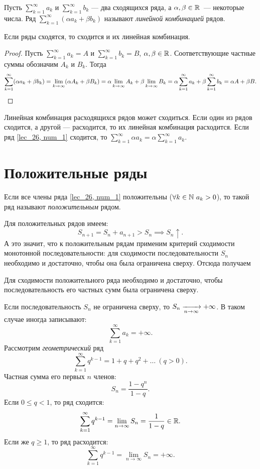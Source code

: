 \documentclass[../../main.tex]{subfiles}
\begin{document}
Пусть $\sum\limits_{k = 1}^\infty a_k$  и $\sum\limits_{k = 1}^\infty b_k$
 --- два сходящихся ряда, а $\alpha, \beta \in \mathbb{R}$~--- некоторые числа.
Ряд $\sum\limits_{k = 1}^\infty(\alpha a_k + \beta b_k)$
 называют \emph{линейной комбинацией} рядов. 
\begin{thm}
Если ряды сходятся, то сходится и их линейная комбинация.
 \end{thm}
\begin{proof}
	Пусть  $\sum\limits_{k = 1}^\infty a_k = A$  
	и $\sum\limits_{k = 1}^\infty b_k = B$, \enspace
	 $\alpha, \beta \in \mathbb{R}$. Соответствующие частные суммы обозначим $A_k$ и 
	 $B_k$. Тогда
 	\[
 		\sum\limits_{k = 1}^\infty(\alpha a_k + \beta b_k) =
 		\lim\limits_{k \to \infty} (\alpha A_k + \beta B_k) =
 		\alpha\lim\limits_{k \to \infty} A_k +
 		\beta\lim\limits_{k \to \infty} B_k =
 		\alpha\sum\limits_{k = 1}^\infty a_k + 
 		\beta\sum\limits_{k = 1}^\infty b_k = \alpha A + 
 		\beta B. \qedhere
 	\]
 \end{proof}
 Линейная комбинация расходящихся рядов может сходиться.
 Если один из рядов сходится, а другой --- расходится, то их линейная комбинация
 расходится. Если ряд \eqref{lec_26, num_1} сходится, 
 то $\sum\limits_{k=1}^\infty \alpha a_k = \alpha \sum\limits_{k=1}^\infty a_k$.
 \section{Положительные ряды}
\begin{definition}
Если все члены ряда \eqref{lec_26, num_1} положительны
($\forall k \in \N \ a_k > 0$),
то такой ряд называют \emph{положительным} рядом.
\end{definition}
Для положительных рядов имеем:
\[
	S_{n+1} = S_n + a_{n+1}  > S_n \implies S_n \uparrow.
\]
А это значит, что к положительным рядам применим 
критерий сходимости монотонной последовательности: для сходимости последовательности $S_n$ необходимо и достаточно, чтобы она была ограничена сверху. Отсюда получаем
 \begin{thm} 
 	\label{lec26:pos_series}
 	 Для сходимости положительного ряда 
 	 необходимо и достаточно, чтобы 
 	 последовательность 
 	 его частных сумм была ограничена сверху.
 \end{thm}
 \begin{rem}
 	 Если  последовательность $S_n$ не ограничена сверху, 
 	 то  $S_n\xrightarrow[n \to \infty]{}{+\infty}$. В таком случае иногда записывают:
 	 \[
 		\sum\limits_{k = 1}^\infty a_k= +\infty
	.\]
	Рассмотрим \emph{геометрический} ряд
	 \[
 		\sum\limits_{k = 1}^\infty q^{k-1}=  1 + q + q^2 + \ldots
 		\ (q > 0).
	\]
	Частная сумма его первых $n$ членов:
	\[S_n = \frac{1 - q^n}{1 - q}.\]
	Если $0 \le q < 1$, то ряд сходится:
	\[
	\sum\limits_{k = 1}^\infty q^{k-1} = \lim\limits_{n \to \infty} S_n =
	\frac{1}{1 - q} \in \mathbb{R}
	.\]
	Если же $q \geq 1$, то ряд расходится:
	\[
	\sum\limits_{k = 1}^\infty q^{k-1} = \lim\limits_{n \to \infty} S_n =
	+ \infty
	.\]
 \end{rem}
\end{document}
